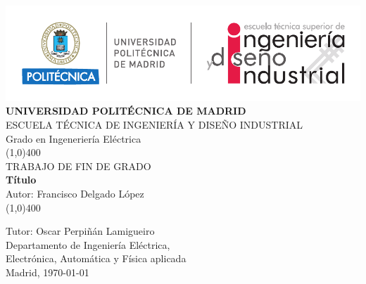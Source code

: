 \begin{center}
\thispagestyle{empty}
\includegraphics[scale=1]{figuras/cabecera.pdf}\\
\vspace*{1cm}
\Large{\textbf{\MakeUppercase{Universidad Politécnica de Madrid}}}\\[3mm]
\Large{{\MakeUppercase{Escuela técnica de ingeniería y diseño industrial}}}\\[3mm]
\Large {Grado en Ingeneriería Eléctrica}\\
\vfill
\line(1,0){400}\\
\Large{{\MakeUppercase{Trabajo de fin de grado}}}\\
\Huge{\textbf{Título}}\\[5mm]
\Large{Autor: Francisco Delgado López}\\
\line(1,0){400}\\
\vfill
\end{center}
\begin{flushright}
\Large {Tutor: Oscar Perpiñán Lamigueiro}\\[3mm]
\Large{Departamento de Ingeniería Eléctrica,\\ Electrónica, Automática y Física aplicada}\\[10mm]
Madrid, \today
\end{flushright}
\cleardoublepage 
